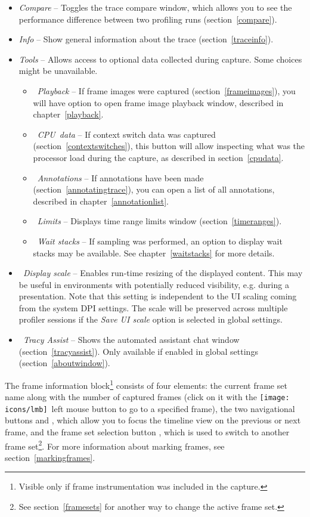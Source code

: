 \documentclass[hidelinks,titlepage,a4paper,twoside]{article}
\newcommand{\LMB}{\texttt{[image: icons/lmb]}}
\begin{document}
\begin{itemize}
\item \emph{\faBalanceScale{} Compare} -- Toggles the trace compare window, which allows you to see the performance difference between two profiling runs (section~\ref{compare}).
\item \emph{\faFingerprint{} Info} -- Show general information about the trace (section~\ref{traceinfo}).
\item \emph{\faTools{} Tools} -- Allows access to optional data collected during capture. Some choices might be unavailable.
\begin{itemize}
\item \emph{\faPlay{}~Playback} -- If frame images were captured (section~\ref{frameimages}), you will have option to open frame image playback window, described in chapter~\ref{playback}.
\item \emph{\faSlidersH{}~CPU~data} -- If context switch data was captured (section~\ref{contextswitches}), this button will allow inspecting what was the processor load during the capture, as described in section~\ref{cpudata}.
\item \emph{\faStickyNote{}~Annotations} -- If annotations have been made (section~\ref{annotatingtrace}), you can open a list of all annotations, described in chapter~\ref{annotationlist}.
\item \emph{\faRuler{}~Limits} -- Displays time range limits window (section~\ref{timeranges}).
\item \emph{\faHourglassHalf{}~Wait stacks} -- If sampling was performed, an option to display wait stacks may be available. See chapter~\ref{waitstacks} for more details.
\end{itemize}
\item \emph{\faSearchPlus{}~Display scale} -- Enables run-time resizing of the displayed content. This may be useful in environments with potentially reduced visibility, e.g. during a presentation. Note that this setting is independent to the UI scaling coming from the system DPI settings. The scale will be preserved across multiple profiler sessions if the \emph{Save UI scale} option is selected in global settings.
\item \emph{\faRobot{}~Tracy Assist} -- Shows the automated assistant chat window (section~\ref{tracyassist}). Only available if enabled in global settings (section~\ref{aboutwindow}).
\end{itemize}

The frame information block\footnote{Visible only if frame instrumentation was included in the capture.} consists of four elements: the current frame set name along with the number of captured frames (click on it with the \LMB{}~left mouse button to go to a specified frame), the two navigational buttons \faCaretLeft{} and \faCaretRight{}, which allow you to focus the timeline view on the previous or next frame, and the frame set selection button \faCaretDown{}, which is used to switch to another frame set\footnote{See section~\ref{framesets} for another way to change the active frame set.}. For more information about marking frames, see section~\ref{markingframes}.
\end{document}
